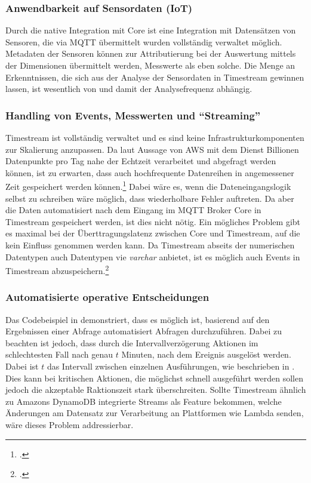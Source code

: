 \subsubsection{Anwendbarkeit auf Sensordaten (IoT)}
Durch die native Integration mit \AWSIOT{} Core ist eine Integration mit Datensätzen von Sensoren, die via \ac{MQTT} übermittelt wurden vollständig verwaltet möglich. Metadaten der Sensoren können zur Attributierung bei der Auswertung mittels der Dimensionen übermittelt werden, Messwerte als eben solche. Die Menge an Erkenntnissen, die sich aus der Analyse der Sensordaten in Timestream gewinnen lassen, ist wesentlich von  und damit der Analysefrequenz abhängig.

\subsubsection{Handling von Events, Messwerten und \enquote{Streaming}}
Timestream ist vollständig verwaltet und es sind keine Infrastrukturkomponenten zur Skalierung anzupassen. Da laut Aussage von \ac{AWS} mit dem Dienst Billionen Datenpunkte pro Tag nahe der Echtzeit verarbeitet und abgefragt werden können, ist zu erwarten, dass auch hochfrequente Datenreihen in angemessener Zeit gespeichert werden können.\footcite[Vgl.][]{AmazonWebServicesInc..2020g} Dabei wäre es, wenn die Dateneingangslogik selbst zu schreiben wäre möglich, dass wiederholbare Fehler auftreten. Da aber die Daten automatisiert nach dem Eingang im \ac{MQTT} Broker \AWSIOT{} Core in Timestream gespeichert werden, ist dies nicht nötig. Ein mögliches Problem gibt es maximal bei der Überttragungslatenz zwischen \AWSIOT{} Core und Timestream, auf die kein Einfluss genommen werden kann.
Da Timestream abseits der numerischen Datentypen auch Datentypen vie \textit{varchar} anbietet, ist es möglich auch Events in Timestream abzuspeichern.\footcite[Vgl.][]{AmazonWebServicesInc..o.J.r}


\subsubsection{Automatisierte operative Entscheidungen}
Das Codebeispiel in  demonstriert, dass es möglich ist, basierend auf den Ergebnissen einer Abfrage automatisiert Abfragen durchzuführen. Dabei zu beachten ist jedoch, dass durch die Intervallverzögerung Aktionen im schlechtesten Fall nach genau $t$ Minuten, nach dem Ereignis ausgelöst werden. Dabei ist $t$ das Intervall zwischen einzelnen Ausführungen, wie beschrieben in . Dies kann bei kritischen Aktionen, die möglichst schnell ausgeführt werden sollen jedoch die akzeptable Raktionszeit stark überschreiten. Sollte Timestream ähnlich zu Amazons DynamoDB integrierte Streams als Feature bekommen, welche Änderungen am Datensatz zur Verarbeitung an Plattformen wie Lambda senden, wäre dieses Problem addressierbar.

